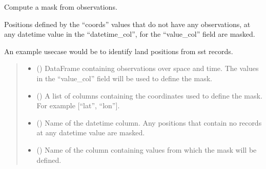 \documentclass[letterpaper,10pt,english]{sphinxmanual}
\begin{document}
\begin{fulllineitems}
\label{\detokenize{misc:glomar_gridding.mask.mask_from_obs_frame}}
\pysigstartsignatures
\pysiglinewithargsret
{}
{\sphinxparamcomma {}\sphinxparamcomma {}\sphinxparamcomma {}}
{}
\pysigstopsignatures
\sphinxAtStartPar
Compute a mask from observations.

\sphinxAtStartPar
Positions defined by the “coords” values that do not have any observations,
at any datetime value in the “datetime\_col”, for the “value\_col” field are
masked.

\sphinxAtStartPar
An example use\sphinxhyphen{}case would be to identify land positions from sst records.
\begin{quote}\begin{description}
\begin{itemize}
\item {}
\sphinxAtStartPar
{} () \textendash{} DataFrame containing observations over space and time. The values in
the “value\_col” field will be used to define the mask.

\item {}
\sphinxAtStartPar
{} (\sphinxstyleliteralemphasis{\sphinxupquote{ | }}\sphinxstyleliteralemphasis{\sphinxupquote{{[}}}\sphinxstyleliteralemphasis{\sphinxupquote{{]}}}) \textendash{} A list of columns containing the coordinates used to define the mask.
For example {[}“lat”, “lon”{]}.

\item {}
\sphinxAtStartPar
{} () \textendash{} Name of the datetime column. Any positions that contain no records at
any datetime value are masked.

\item {}
\sphinxAtStartPar
{} () \textendash{} Name of the column containing values from which the mask will be
defined.


\end{itemize}
\end{description}
\end{quote}
\end{fulllineitems}
\end{document}
